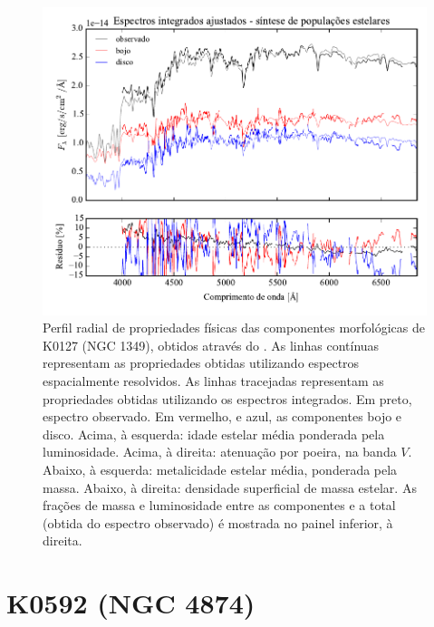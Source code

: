 \begin{figure}
	\includegraphics[page=4]{figuras/sample006a_synthesis}
	\caption[Propriedades físicas das componentes morfológicas de K0127 (NGC 1349)]
	{Perfil radial de propriedades físicas das componentes morfológicas de
	K0127 (NGC 1349), obtidos através do \starlight. As linhas contínuas
	representam as propriedades obtidas utilizando espectros espacialmente
	resolvidos. As linhas tracejadas representam as propriedades obtidas utilizando
	os espectros integrados. Em preto, espectro observado. Em vermelho, e azul, as
	componentes bojo e disco. Acima, à esquerda: idade estelar média ponderada pela
	luminosidade. Acima, à direita: atenuação por poeira, na banda $V$. Abaixo, à
	esquerda: metalicidade estelar média, ponderada pela massa. Abaixo, à direita:
	densidade superficial de massa estelar. As frações de massa e luminosidade
	entre as componentes e a total (obtida do espectro observado) é mostrada no
	painel inferior, à direita.}
	\label{fig:decompSinteseRadprof:K0127}
\end{figure}


\section{K0592 (NGC 4874)}
\label{apendice:Decomp:K0592}

